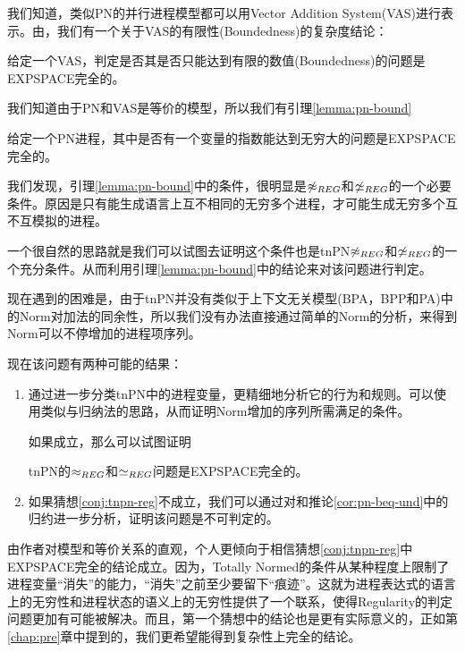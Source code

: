 我们知道，类似PN的并行进程模型都可以用Vector Addition System(VAS)进行表示。由\cite{Rackoff1978,Cardoza1976}，我们有一个关于VAS的有限性(Boundedness)的复杂度结论：

\begin{lem}\label{lemma:vas}
给定一个VAS，判定是否其是否只能达到有限的数值(Boundedness)的问题是EXPSPACE完全的。
\end{lem}

我们知道由于PN和VAS是等价的模型，所以我们有引理\ref{lemma:pn-bound}

\begin{lem}\label{lemma:pn-bound}
给定一个PN进程，其中是否有一个变量的指数能达到无穷大的问题是EXPSPACE完全的。
\end{lem}

我们发现，引理\ref{lemma:pn-bound}中的条件，很明显是$\not\approx_{REG}$和$\not\simeq_{REG}$的一个必要条件。原因是只有能生成语言上互不相同的无穷多个进程，才可能生成无穷多个互不互模拟的进程。

一个很自然的思路就是我们可以试图去证明这个条件也是tnPN$\not\approx_{REG}$和$\not\simeq_{REG}$的一个充分条件。从而利用引理\ref{lemma:pn-bound}中的结论来对该问题进行判定。

现在遇到的困难是，由于tnPN并没有类似于上下文无关模型(BPA，BPP和PA)中的Norm对加法的同余性，所以我们没有办法直接通过简单的Norm的分析，来得到Norm可以不停增加的进程项序列。

现在该问题有两种可能的结果：

\begin{enumerate}
	\item 通过进一步分类tnPN中的进程变量，更精细地分析它的行为和规则。可以使用类似与归纳法的思路，从而证明Norm增加的序列所需满足的条件。

如果成立，那么可以试图证明

\begin{conj}\label{conj:tnpn-reg}
tnPN的$\approx_{REG}$和$\simeq_{REG}$问题是EXPSPACE完全的。
\end{conj}

	\item 如果猜想\ref{conj:tnpn-reg}不成立，我们可以通过对\cite{Jancar1996}和推论\ref{cor:pn-beq-und}中的归约进一步分析，证明该问题是不可判定的。
\end{enumerate}

由作者对模型和等价关系的直观，个人更倾向于相信猜想\ref{conj:tnpn-reg}中EXPSPACE完全的结论成立。因为，Totally Normed的条件从某种程度上限制了进程变量``消失''的能力，``消失''之前至少要留下``痕迹''。这就为进程表达式的语言上的无穷性和进程状态的语义上的无穷性提供了一个联系，使得Regularity的判定问题更加有可能被解决。而且，第一个猜想中的结论也是更有实际意义的，正如第\ref{chap:pre}章中提到的，我们更希望能得到复杂性上完全的结论。


